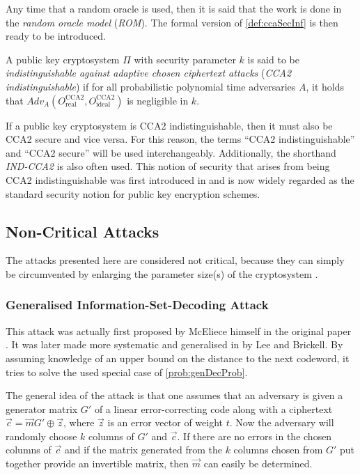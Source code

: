 Any time that a random oracle is used, then it is said that the work is done in the \emph{random oracle model} (\emph{ROM}). The formal version of \cref{def:ccaSecInf} is then ready to be introduced.
\begin{defi}
\label{def:cca2SecFor}
	A public key cryptosystem $\Pi$ with security parameter $k$ is said to be \emph{indistinguishable against adaptive chosen ciphertext attacks} (\emph{CCA2 indistinguishable}) if for all probabilistic polynomial time adversaries $A$, it holds that $Adv_A\left(O_{\mathrm{real}}^{\mathrm{CCA2}}, O_{\mathrm{ideal}}^{\mathrm{CCA2}}\right)$ is negligible in $k$.
\end{defi}
If a public key cryptosystem is CCA2 indistinguishable, then it must also be CCA2 secure and vice versa. For this reason, the terms ``CCA2 indistinguishable'' and ``CCA2 secure'' will be used interchangeably. Additionally, the shorthand \emph{IND-CCA2} is also often used. This notion of security that arises from being CCA2 indistinguishable was first introduced in \cite{RS} and is now widely regarded as the standard security notion for public key encryption schemes.



\subsection{Non-Critical Attacks}
\label{subsec:nonCriAtt}

The attacks presented here are considered not critical, because they can simply be circumvented by enlarging the parameter size(s) of the cryptosystem \cite{KI}.



\subsubsection{Generalised Information-Set-Decoding Attack}
\label{subsubsec:genInfSetDecAtt}

This attack was actually first proposed by McEliece himself in the original paper \cite{mceliece}. It was later made more systematic and generalised in \cite{LB} by Lee and Brickell. By assuming knowledge of an upper bound on the distance to the next codeword, it tries to solve the used special case of \cref{prob:genDecProb}.

The general idea of the attack is that one assumes that an adversary is given a generator matrix $G'$ of a linear error-correcting code along with a ciphertext $\vec{c} = \vec{m} G' \oplus \vec{z}$, where $\vec{z}$ is an error vector of weight $t$. Now the adversary will randomly choose $k$ columns of $G'$ and $\vec{c}$. If there are no errors in the chosen columns of $\vec{c}$ and if the matrix generated from the $k$ columns chosen from $G'$ put together provide an invertible matrix, then $\vec{m}$ can easily be determined.

